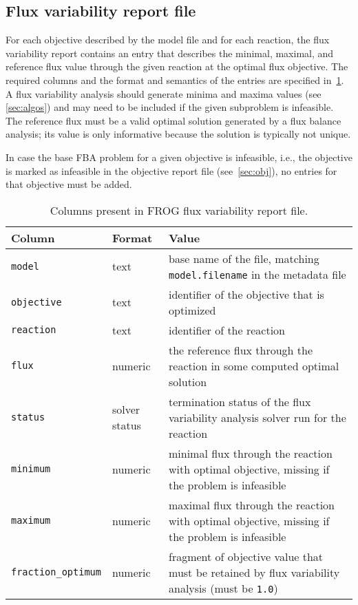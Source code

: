 \subsection{Flux variability report file}
\label{sec:fva}
For each objective described by the model file and for each reaction, the flux variability report contains an entry that describes the minimal, maximal, and reference flux value through the given reaction at the optimal flux objective. The required columns and the format and semantics of the entries are specified in~\cref{tab:fvafields}.
A flux variability analysis should generate minima and maxima values (see \cref{sec:algos}) and may need to be included if the given subproblem is infeasible. The reference flux must be a valid optimal solution generated by a flux balance analysis; its value is only informative because the solution is typically not unique.

In case the base FBA problem for a given objective is infeasible, i.e., the objective is marked as infeasible in the objective report file (see~\cref{sec:obj}), no entries for that objective must be added.



\begin{table}\tablefont
\begin{tabular}{llp{30em}}
\toprule
Column & Format & Value \\
\midrule
\verb|model|
 & text
 & base name of the file, matching \verb|model.filename| in the metadata file
 \\
\verb|objective|
 & text
 & identifier of the objective that is optimized
 \\
\verb|reaction|
 & text
 & identifier of the reaction
 \\
\verb|flux|
 & numeric
 & the reference flux through the reaction in some computed optimal solution
 \\
\verb|status|
 & solver status
 & termination status of the flux variability analysis solver run for the reaction
 \\
\verb|minimum|
 & numeric
 & minimal flux through the reaction with optimal objective, missing if the problem is infeasible
 \\
\verb|maximum|
 & numeric
 & maximal flux through the reaction with optimal objective, missing if the problem is infeasible
 \\
\verb|fraction_optimum|
 & numeric
 & fragment of objective value that must be retained by flux variability analysis (must be \verb|1.0|)
 \\
\bottomrule
\end{tabular}
\caption{Columns present in FROG flux variability report file.}
\label{tab:fvafields}
\end{table}

